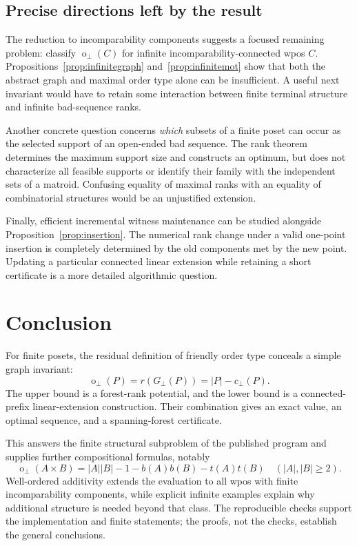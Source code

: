 \documentclass[11pt,a4paper]{article}
\theoremstyle{definition}
\theoremstyle{remark}
\newcommand{\fot}{\operatorname{o}_{\perp}}
\newcommand{\incg}{G_{\perp}}
\newcommand{\cc}{c_{\perp}}
\begin{document}
\subsection{Precise directions left by the result}

The reduction to incomparability components suggests a focused remaining
problem: classify $\fot(C)$ for infinite incomparability-connected wpos $C$.
Propositions~\ref{prop:infinitegraph} and~\ref{prop:infinitemot} show that both
the abstract graph and maximal order type alone can be insufficient. A useful
next invariant would have to retain some interaction between finite
terminal structure and infinite bad-sequence ranks.

Another concrete question concerns \emph{which} subsets of a finite poset
can occur as the selected support of an open-ended bad sequence. The rank
theorem determines the maximum support size and constructs an optimum, but
does not characterize all feasible supports or identify their family with
the independent sets of a matroid. Confusing equality of maximal ranks with
an equality of combinatorial structures would be an unjustified extension.

Finally, efficient incremental witness maintenance can be studied alongside
Proposition~\ref{prop:insertion}. The numerical rank change under a valid
one-point insertion is completely determined by the old components met by
the new point. Updating a particular connected linear extension while
retaining a short certificate is a more detailed algorithmic question.

\section{Conclusion}

For finite posets, the residual definition of friendly order type conceals a
simple graph invariant:
\[
 \fot(P)=r(\incg(P))=|P|-\cc(P).
\]
The upper bound is a forest-rank potential, and the lower bound is a
connected-prefix linear-extension construction. Their combination gives an
exact value, an optimal sequence, and a spanning-forest certificate.

This answers the finite structural subproblem of the published program and
supplies further compositional formulas, notably
\[
 \fot(A\times B)=|A||B|-1-b(A)b(B)-t(A)t(B)
 \quad(|A|,|B|\ge2).
\]
Well-ordered additivity extends the evaluation to all wpos with finite
incomparability components, while explicit infinite examples explain why
additional structure is needed beyond that class. The reproducible checks
support the implementation and finite statements; the proofs, not the
checks, establish the general conclusions.
\end{document}
